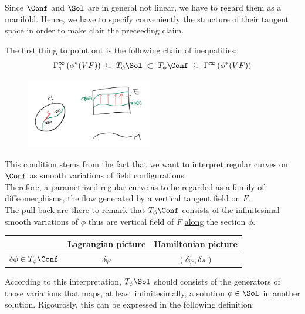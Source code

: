 \documentclass[a4paper,12pt]{scrartcl}  %
\begin{document}
Since $\Conf$ and $\Sol$ are in general not linear, we have to regard them as a manifold.
Hence, we have to specify conveniently the structure of their tangent space in order to make clair the preceeding claim.

The first thing to point out is the following chain of inequalities:
\begin{equation}
	\Gamma^\infty_c\left(\phi^*(VF)\right) \; \subseteq \; T_\phi\Sol \; \subset \; T_\phi\Conf \; \subseteq \; \Gamma^\infty\left( \phi^\ast (VF) \right)
\end{equation}

\begin{figure}
\centering
\includegraphics[width=0.49\textwidth]{Pictures/variations.png}
\end{figure}

This condition stems from the fact that we want to interpret regular curves on $\Conf$ as smooth variations of field configurations. \\
Therefore, a parametrized regular curve as to be regarded as a family of diffeomerphisms, the flow generated by a vertical tangent field on $F$.\\
The pull-back are there to remark that $T_\phi \Conf$ consists of the infinitesimal smooth variations of $\phi$ thus are vertical field of $F$ \underline{along} the section $\phi$.
\begin{notation}
	\begin{center}
		\begin{tabular}{|c|c|c|}
			\hline
			 & Lagrangian picture & Hamiltonian picture \\
			\hline
			$\delta \phi \in T_\phi \Conf$		&	$\delta \varphi$		&	$(\delta \varphi, \delta \pi)$ \\
			\hline
		\end{tabular}
	\end{center}
\end{notation}

According to this interpretation, $T_\phi\Sol$ should consists of the generators of those variations that maps, at least infinitesimally, a solution $\phi\in\Sol$ in another solution.
Rigourosly, this can be expressed in the following definition:
\end{document}
